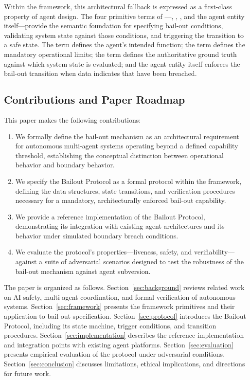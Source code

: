 Within the \bxthree framework, this architectural fallback is expressed as a first-class property of agent design. The four primitive terms of \bxthree—\purpose, \bounds, \fact, and the agent entity itself—provide the semantic foundation for specifying bail-out conditions, validating system state against those conditions, and triggering the transition to a safe state. The \purpose term defines the agent's intended function; the \bounds term defines the mandatory operational limits; the \fact term defines the authoritative ground truth against which system state is evaluated; and the agent entity itself enforces the bail-out transition when \fact data indicates that \bounds have been breached.

\subsection{Contributions and Paper Roadmap}

This paper makes the following contributions:

\begin{enumerate}
\item We formally define the bail-out mechanism as an architectural requirement for autonomous multi-agent systems operating beyond a defined capability threshold, establishing the conceptual distinction between operational behavior and boundary behavior.
\item We specify the Bailout Protocol as a formal protocol within the \bxthree framework, defining the data structures, state transitions, and verification procedures necessary for a mandatory, architecturally enforced bail-out capability.
\item We provide a reference implementation of the Bailout Protocol, demonstrating its integration with existing agent architectures and its behavior under simulated boundary breach conditions.
\item We evaluate the protocol's properties—liveness, safety, and verifiability—against a suite of adversarial scenarios designed to test the robustness of the bail-out mechanism against agent subversion.
\end{enumerate}

The paper is organized as follows. Section~\ref{sec:background} reviews related work on AI safety, multi-agent coordination, and formal verification of autonomous systems. Section~\ref{sec:framework} presents the \bxthree framework primitives and their application to bail-out specification. Section~\ref{sec:protocol} introduces the Bailout Protocol, including its state machine, trigger conditions, and transition procedures. Section~\ref{sec:implementation} describes the reference implementation and integration points with existing agent platforms. Section~\ref{sec:evaluation} presents empirical evaluation of the protocol under adversarial conditions. Section~\ref{sec:conclusion} discusses limitations, ethical implications, and directions for future work.

